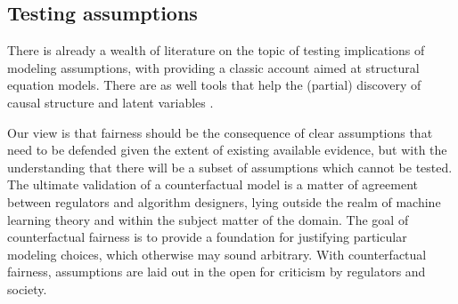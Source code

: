 \subsection{Testing assumptions}

There is already a wealth of literature on the topic of testing implications of modeling assumptions, with \citep{bollen:93} providing a classic account aimed at structural equation models. There are as well tools that help the (partial) discovery of causal structure \citep{sgs:00,peters:14} and latent variables \citep{silva:10b,HalpernSontag_uai13,anima:14}.

Our view is that fairness should be the consequence of clear assumptions that need to be defended given the extent of existing available evidence, but with the understanding that there will be a subset of assumptions which cannot be tested. The ultimate validation of a counterfactual model is a matter of agreement between regulators and algorithm designers, lying outside the realm of machine learning theory and within the subject matter of the domain. The goal of counterfactual fairness is to provide a foundation for justifying particular modeling choices, which otherwise may sound arbitrary. With counterfactual fairness, assumptions are laid out in the open for criticism by regulators and society.
